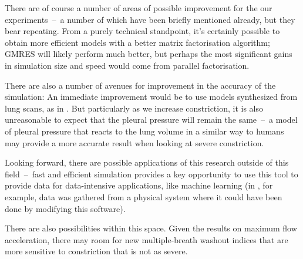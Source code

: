 There are of course a number of areas of possible improvement for the our experiments~--~a number of
which have been briefly mentioned already, but they bear repeating. From a purely technical
standpoint, it's certainly possible to obtain more efficient models with a better matrix
factorisation algorithm; GMRES will likely perform much better, but perhaps the most significant
gains in simulation size and speed would come from parallel factorisation.

There are also a number of avenues for improvement in the accuracy of the simulation: An immediate
improvement would be to use models synthesized from lung scans, as in \cite{FoyEtAl2017}. But
particularly as we increase constriction, it is also unreasonable to expect that the pleural
pressure will remain the same~--~a model of pleural pressure that reacts to the lung volume in a
similar way to humans may provide a more accurate result when looking at severe constriction.

\breakpars

Looking forward, there are possible applications of this research outside of this field~--~fast and
efficient simulation provides a key opportunity to use this tool to provide data for data-intensive
applications, like machine learning (in \cite{SuoEtAl2021}, for example, data was gathered from a
physical system where it could have been done by modifying this software).

There are also possibilities within this space. Given the results on maximum flow acceleration,
there may room for new multiple-breath washout indices that are more sensitive to constriction that
is not as severe.
